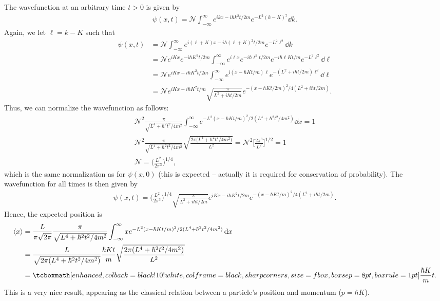 The wavefunction at an arbitrary time $t > 0$ is given by
\begin{eqnarray}
    \label{eq:psi-t}
    \psi(x,t) = \mathcal{N} \int_{-\infty}^{\infty} e^{ikx - i\hbar k^2t/2m} e^{-L^2(k-K)^2} \dd{k}
.\end{eqnarray}
Again, we let $\ell = k - K$ such that
\begin{align}
    \label{eq:shift-wavefunc-t}
    \psi(x,t) &= \mathcal{N} \int_{-\infty}^{\infty} e^{i(\ell + K)x - i \hbar (\ell + K)^2t/2m} e^{-L^2\ell^2} \dd{k} \\
              &= \mathcal{N} e^{iKx}e^{-i\hbar K^2 t/2m} \int_{-\infty}^{\infty} e^{i \ell x}e^{-i\hbar \ell^2 t/2m} e^{-i\hbar \ell K t/m} e^{-L^2\ell^2} \dd{\ell} \\
              &= \mathcal{N} e^{iKx - i\hbar K^2 t/2m} \int_{-\infty}^{\infty} e^{i(x-\hbar K t/m)\ell} e^{-(L^2 + i\hbar t/2m)\ell^2} \dd{\ell} \\
              &= \mathcal{N} e^{iKx - i\hbar K^2 t/m} \sqrt{\frac{\pi}{L^2 + i\hbar t/2m}} e^{-(x-\hbar K t/2m)^2/4(L^2 + i\hbar t/2m)}
.\end{align}
Thus, we can normalize the wavefunction as follows:
\begin{gather}
    \label{eq:normalize-t}
    \mathcal{N}^2 \frac{\pi}{\sqrt{L^4 + \hbar^2 t^2/4m^2}} \int_{-\infty}^{\infty} e^{-L^2(x-\hbar K t/m)^2/2(L^4 + \hbar^2 t^2/4m^2)} \dd{x} = 1 \\
    \mathcal{N}^2 \frac{\pi}{\sqrt{L^{4} + \hbar^2t^2/4m^2}} \sqrt{\frac{2\pi\Big( L^{4} + \hbar^2 t^2/4m^2 \Big)}{L^2}} = \mathcal{N}^2 \Big[ \frac{2 \pi^3}{L^2} \Big]^{1/2} = 1 \\
    \mathcal{N} = \Big( \frac{L^2}{2\pi^3} \Big)^{1/4}
,\end{gather}
which is the same normalization as for $\psi(x,0)$ (this is expected -- actually it is required for conservation of probability).
The wavefunction for all times is then given by
\begin{eqnarray}
    \label{eq:wavefunc-t}
    \psi(x,t) = \Big( \frac{L^2}{2\pi^3} \Big)^{1/4} \sqrt{\frac{\pi}{L^2 + i\hbar t/2m}} e^{iKx - i\hbar K^2 t/2m} e^{-(x - \hbar Kt/m)^2/4(L^2 + i\hbar t/2m)}
.\end{eqnarray}
Hence, the expected position is 
\begin{align}
    \label{eq:expval-x-t}
    \expval{x} &= \frac{L}{\pi\sqrt{2\pi}} \frac{\pi}{\sqrt{L^{4} + \hbar^2 t^2/4m^2}} \int_{-\infty}^{\infty} x e^{-L^2(x-\hbar K t/m)^2/2(L^4 + \hbar^2 t^2/4m^2)} \dd{x} \\
               &= \frac{L}{\sqrt{2\pi(L^{4} + \hbar^2 t^2/4m^2)}} \frac{\hbar K t}{m} \sqrt{\frac{2\pi(L^{4} + \hbar^2t^2/4m^2)}{L^2}} \\
               &= \eqbox{ \frac{\hbar K}{m} t }
.\end{align}
This is a very nice result, appearing as the classical relation between a particle's position and momentum ($p = \hbar K$).

